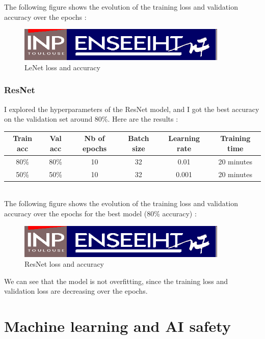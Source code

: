 \documentclass[12pt,a4paper]{article}
\begin{document}
The following figure shows the evolution of the training loss and validation accuracy over the epochs :

\begin{figure}[ht]
    \centering
    \includegraphics[width=10cm]{src/inp_n7.png}
    \caption{LeNet loss and accuracy}
\end{figure}


\subsubsection{ResNet}

I explored the hyperparameters of the ResNet model, and I got the best accuracy on the validation set around 80\%.
Here are the results :\\

\begin{tabular}{|c|c|c|c|c|c|}
    \hline
    \textbf{Train acc} & \textbf{Val acc} & \textbf{Nb of epochs} & \textbf{Batch size} & \textbf{Learning rate} & \textbf{Training time} \\
    \hline
    80\% & 80\% & 10 & 32 & 0.01 & 20 minutes \\
    \hline
    50\% & 50\% & 10 & 32 & 0.001 & 20 minutes \\
    \hline
\end{tabular}\\

The following figure shows the evolution of the training loss and validation accuracy over the epochs for the best model (80\% accuracy) :

\begin{figure}[ht]
    \centering
    \includegraphics[width=10cm]{src/inp_n7.png}
    \caption{ResNet loss and accuracy}
\end{figure}

We can see that the model is not overfitting, since the training loss and validation loss are decreasing over the epochs.


\section{Machine learning and AI safety}
\end{document}
